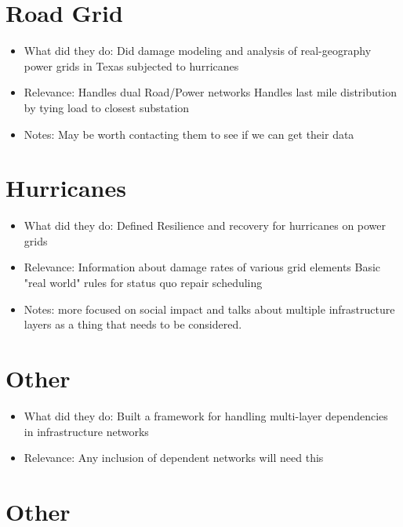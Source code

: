 \documentclass{article}
\begin{document}
	\section{Road Grid}
	\cite{WinklerEA2010}
	\begin{itemize}
		\item What did they do: \newline
		Did damage modeling and analysis of real-geography power grids in Texas subjected to hurricanes
		\item Relevance: \newline
		Handles dual Road/Power networks \newline
		Handles last mile distribution by tying load to closest substation 
		\item Notes: \newline
		May be worth contacting them to see if we can get their data
	\end{itemize}
	\section{Hurricanes}
	\cite{OuyangEA2014}
	\begin{itemize}
	\item What did they do: \newline
	Defined Resilience and recovery for hurricanes on power grids
	\item Relevance: \newline
	Information about damage rates of various grid elements \newline
	Basic "real world" rules for status quo repair scheduling 
	\item Notes: \newline
	more focused on social impact and talks about multiple infrastructure layers as a thing that needs to be considered.
	\end{itemize}
	\section{Other}
	\cite{SvendsenEA2007}
	\begin{itemize}
		\item What did they do: \newline
		Built a framework for handling multi-layer dependencies in infrastructure networks
		\item Relevance: \newline
		Any inclusion of dependent networks will need this 
	\end{itemize}
	\section{Other}
	
	
	
\end{document}
